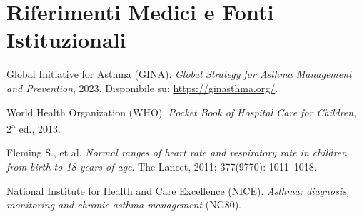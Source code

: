 \documentclass[11pt,a4paper]{article}
\begin{document}
\newpage
\section{Riferimenti Medici e Fonti Istituzionali}

\begin{enumerate}[leftmargin=2em,itemsep=4pt,label={[\arabic*]}]
  \item \label{ref:gina} Global Initiative for Asthma (GINA). \textit{Global Strategy for Asthma Management and Prevention}, 2023. Disponibile su: \url{https://ginasthma.org/}.
  \item \label{ref:who} World Health Organization (WHO). \textit{Pocket Book of Hospital Care for Children}, 2\textsuperscript{a} ed., 2013.
  \item \label{ref:fleming} Fleming S., et al. \textit{Normal ranges of heart rate and respiratory rate in children from birth to 18 years of age}. The Lancet, 2011; 377(9770): 1011--1018.
  \item \label{ref:nice} National Institute for Health and Care Excellence (NICE). \textit{Asthma: diagnosis, monitoring and chronic asthma management} (NG80).
\end{enumerate}
\end{document}
